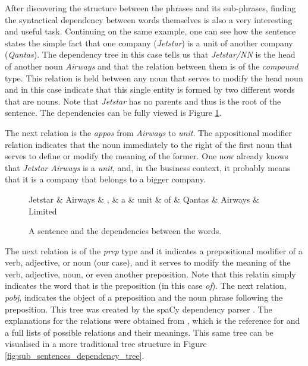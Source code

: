 \documentclass[11pt,a4paper,openright]{memoir}
\begin{document}
After discovering the structure between the phrases and its sub-phrases, finding the syntactical dependency between words themselves is also a very interesting and useful task. Continuing on the same example, one can see how the sentence states the simple fact that one company (\emph{Jetstar}) is a unit of another company (\emph{Qantas}). The dependency tree in this case tells us that \emph{Jetstar/NN} is the head of another noun \emph{Airways} and that the relation between them is of the \emph{compound} type. This relation is held between any noun that serves to modify the head noun and in this case indicate that this single entity is formed by two different words that are nouns. Note that \emph{Jetstar} has no parents and thus is the root of the sentence. The dependencies can be fully viewed is Figure \ref{fig:sub_sentences_dependency}.

The next relation is the \emph{appos} from \emph{Airways} to \emph{unit}. The appositional modifier relation indicates that the noun  immediately to the right of the first noun that serves to define or modify the meaning of the former. One now already knows that \emph{Jetstar Airways} is a \emph{unit}, and, in the business context, it probably means that it is a company that belongs to a bigger company.

\begin{figure}[!htbp]
  \centering
\begin{dependency}[theme = simple]
   \begin{deptext}[column sep=1em]
      Jetstar \& Airways \& , \& a \& unit \& of \& Qantas \& Airways \& Limited \\
   \end{deptext}
\end{dependency}
  \caption[A sentence and the dependencies between the words.]{A sentence and the dependencies between the words.}
  \label{fig:sub_sentences_dependency}
\end{figure}

The next relation is of the \emph{prep} type and it indicates a prepositional modifier of a verb, adjective, or noun (our case), and it serves to modify the meaning of the verb, adjective, noun, or even another preposition. Note that this relatin simply indicates the word that is the preposition (in this case \emph{of}). The next relation, \emph{pobj},  indicates the object of a preposition and the noun phrase following the preposition. This tree was created by the spaCy dependency parser \cite{honnibal-johnson:2015:EMNLP, spacy}. The explanations for the relations were obtained from \cite{Marneffe08stanfordtyped}, which is the reference for and a full lists of possible relations and their meanings. This same tree can be visualised in a more traditional tree structure in Figure \ref{fig:sub_sentences_dependency_tree}.
\end{document}
